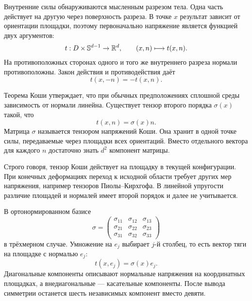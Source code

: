 Внутренние силы обнаруживаются мысленным разрезом тела. Одна часть действует на другую через поверхность разреза. В точке $x$ результат зависит от ориентации площадки, поэтому первоначально напряжение является функцией двух аргументов:
\begin{equation}
\label{eq:traction-map-v02}
t:D\times\mathbb S^{d-1}\to\mathbb{R}^d,
\qquad
(x,n)\longmapsto t(x,n).
\end{equation}
На противоположных сторонах одного и того же внутреннего разреза нормали противоположны. Закон действия и противодействия даёт
\begin{equation}
\label{eq:traction-action-reaction-v02}
t(x,-n)=-t(x,n).
\end{equation}

Теорема Коши утверждает, что при обычных предположениях сплошной среды зависимость от нормали линейна. Существует тензор второго порядка $\sigma(x)$ такой, что
\begin{equation}
\label{eq:cauchy-traction-v02}
t(x,n)=\sigma(x)n.
\end{equation}
Матрица $\sigma$ называется тензором напряжений Коши. Она хранит в одной точке силы, передаваемые через площадки всех ориентаций. Вместо отдельного вектора для каждого $n$ достаточно знать $d^2$ компонент матрицы.

Строго говоря, тензор Коши действует на площадку в текущей конфигурации. При конечных деформациях переход к исходной области требует других мер напряжения, например тензоров Пиолы--Кирхгофа. В линейной упругости различие площадей и нормалей имеет второй порядок и далее не учитывается.

В ортонормированном базисе
\begin{equation}
\label{eq:cauchy-stress-matrix-v02}
\sigma=
\begin{pmatrix}
\sigma_{11}&\sigma_{12}&\sigma_{13}\\
\sigma_{21}&\sigma_{22}&\sigma_{23}\\
\sigma_{31}&\sigma_{32}&\sigma_{33}
\end{pmatrix}
\end{equation}
в трёхмерном случае. Умножение на $e_j$ выбирает $j$-й столбец, то есть вектор тяги на площадке с нормалью $e_j$:
\begin{equation}
\label{eq:stress-columns-v02}
t(x,e_j)=\sigma(x)e_j.
\end{equation}
Диагональные компоненты описывают нормальные напряжения на координатных площадках, а внедиагональные --- касательные компоненты. После вывода симметрии останется шесть независимых компонент вместо девяти.

